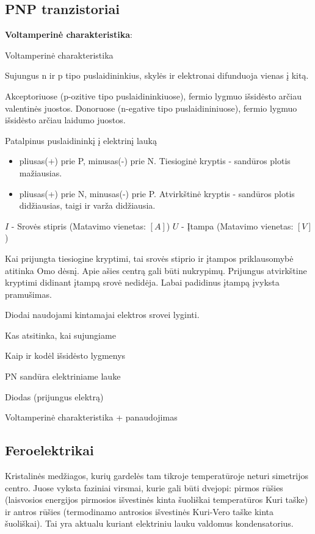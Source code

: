 \subsection{PNP tranzistoriai}

\textbf{Voltamperinė charakteristika}:

{Voltamperinė charakteristika}

Sujungus n ir p tipo puslaidininkius, skylės ir elektronai difunduoja vienas į kitą.

Akceptoriuose (p-ozitive tipo puslaidininkiuose), fermio lygmuo išsidėsto arčiau valentinės juostos.
Donoruose (n-egative tipo puslaidininiuose), fermio lygmuo išsidėsto arčiau laidumo juostos.

Patalpinus puslaidininkį į elektrinį lauką
\begin{itemize}
  \item pliusas(+) prie P, minusas(-) prie N. Tiesioginė kryptis -
  sandūros plotis mažiausias.
  \item pliusas(+) prie N, minusas(-) prie P. Atvirkštinė kryptis -
  sandūros plotis didžiausias, taigi ir varža didžiausia.
\end{itemize}


$I$ - Srovės stipris (Matavimo vienetas: $[A]$)
$U$ - Įtampa (Matavimo vienetas: $[V]$)

Kai prijungta tiesiogine kryptimi, tai srovės stiprio ir įtampos priklausomybė
atitinka Omo dėsnį. Apie ašies centrą gali būti nukrypimų.
Prijungus atvirkštine kryptimi didinant įtampą srovė nedidėja.
Labai padidinus įtampą įvyksta pramušimas.

Diodai naudojami kintamajai elektros srovei lyginti.

\begin{remember}
  \item Kas atsitinka, kai sujungiame
  \item Kaip ir kodėl išsidėsto lygmenys
  \item PN sandūra elektriniame lauke
  \item Diodas (prijungus elektrą)
  \item Voltamperinė charakteristika + panaudojimas
\end{remember}




\subsection{Feroelektrikai}
Kristalinės medžiagos, kurių gardelės tam tikroje temperatūroje neturi
simetrijos centro. Juose vyksta faziniai virsmai, kurie gali būti
dvejopi: pirmos rūšies (laisvosios energijos pirmosios išvestinės
kinta šuoliškai temperatūros Kuri taške) ir antros rūšies (termodinamo
antrosios išvestinės Kuri-Vero taške kinta šuoliškai). Tai yra
aktualu kuriant elektriniu lauku valdomus kondensatorius.

